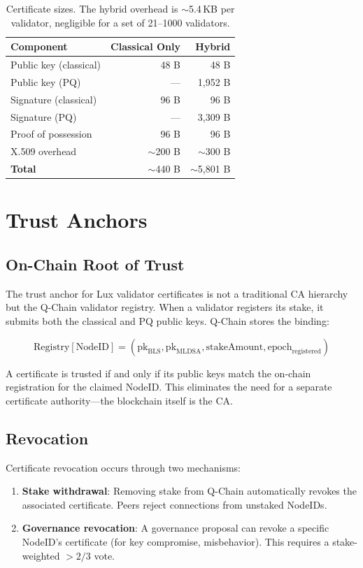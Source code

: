 \documentclass[11pt]{article}
\begin{document}
\begin{table}[h]
\centering
\begin{tabular}{@{}lrr@{}}
\toprule
\textbf{Component} & \textbf{Classical Only} & \textbf{Hybrid} \\
\midrule
Public key (classical) & 48 B & 48 B \\
Public key (PQ) & --- & 1,952 B \\
Signature (classical) & 96 B & 96 B \\
Signature (PQ) & --- & 3,309 B \\
Proof of possession & 96 B & 96 B \\
X.509 overhead & $\sim$200 B & $\sim$300 B \\
\midrule
\textbf{Total} & $\sim$440 B & $\sim$5,801 B \\
\bottomrule
\end{tabular}
\caption{Certificate sizes. The hybrid overhead is $\sim$5.4\,KB per validator, negligible for a set of 21--1000 validators.}
\label{tab:cert-size}
\end{table}

\section{Trust Anchors}

\subsection{On-Chain Root of Trust}

The trust anchor for Lux validator certificates is not a traditional CA hierarchy but the Q-Chain validator registry. When a validator registers its stake, it submits both the classical and PQ public keys. Q-Chain stores the binding:

$$\text{Registry}[\text{NodeID}] = (\text{pk}_{\text{BLS}}, \text{pk}_{\text{MLDSA}}, \text{stakeAmount}, \text{epoch}_{\text{registered}})$$

A certificate is trusted if and only if its public keys match the on-chain registration for the claimed NodeID. This eliminates the need for a separate certificate authority---the blockchain itself is the CA.

\subsection{Revocation}

Certificate revocation occurs through two mechanisms:
\begin{enumerate}
\item \textbf{Stake withdrawal}: Removing stake from Q-Chain automatically revokes the associated certificate. Peers reject connections from unstaked NodeIDs.
\item \textbf{Governance revocation}: A governance proposal can revoke a specific NodeID's certificate (for key compromise, misbehavior). This requires a stake-weighted $>2/3$ vote.
\end{enumerate}
\end{document}
